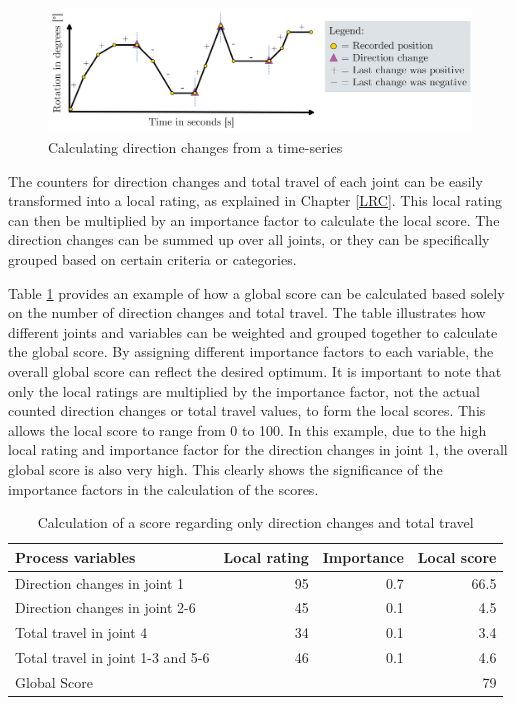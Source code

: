 \begin{figure}[H]
\centerline{\includegraphics[width=1\textwidth]{figures/dirchange.png}}
	\caption{Calculating direction changes from a time-series}
	\label{dirchange}
\end{figure}

The counters for direction changes and total travel of each joint can be easily transformed into a local rating, as explained in Chapter \ref{LRC}. This local rating can then be multiplied by an importance factor to calculate the local score. The direction changes can be summed up over all joints, or they can be specifically grouped based on certain criteria or categories.  

Table \ref{exampleDirTravel} provides an example of how a global score can be calculated based solely on the number of direction changes and total travel. The table illustrates how different joints and variables can be weighted and grouped together to calculate the global score. By assigning different importance factors to each variable, the overall global score can reflect the desired optimum. It is important to note that only the local ratings are multiplied by the importance factor, not the actual counted direction changes or total travel values, to form the local scores. This allows the local score to range from 0 to 100. In this example, due to the high local rating and importance factor for the direction changes in joint 1, the overall global score is also very high. This clearly shows the significance of the importance factors in the calculation of the scores.

\begin{table}[H]
	\centering
	\begin{tabular}{||l|r|r|r||}
		Process variables & Local rating & Importance & Local score\\
		\hline
		\hline
		\hline
		
		Direction changes in joint 1 & 95 & 0.7 & 66.5\\
		Direction changes in joint 2-6 & 45& 0.1&4.5\\
		Total travel in joint 4& 34& 0.1&3.4\\
		Total travel in joint 1-3 and 5-6& 46&0.1&4.6\\
		\hline
		\hline
		\hline
		Global Score& & &79\\
		\hline
		\hline
	\end{tabular}
	
	\caption{Calculation of a score regarding only direction changes and total travel}
	\label{exampleDirTravel}
\end{table}


